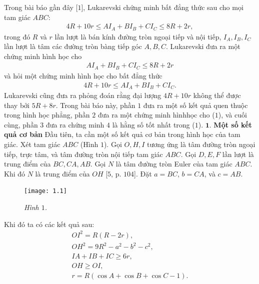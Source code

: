 \begin{multicols}{2}
	\setlength{\abovedisplayskip}{4pt}
	\setlength{\belowdisplayskip}{4pt}
	Trong bài báo gần đây [$1$], Lukarevski chứng minh bất đẳng thức sau cho mọi tam giác $ABC$:
	\begin{align*}
		\label{BDT1}4R+10r\le AI_A+BI_B+CI_C\le 8R+2r,
	\end{align*}
	trong đó $R$ và $r$ lần lượt là bán kính đường tròn ngoại tiếp và nội tiếp, $I_A,I_B,I_C$ lần lượt là tâm các đường tròn bàng tiếp góc $A,B,C$.  
	\vskip 0.05cm
	Lukarevski đưa ra một chứng minh hình học cho 
	\begin{align*}
		AI_A+BI_B+CI_C\le 8R+2r
	\end{align*}
	và hỏi một chứng minh hình học cho bất đẳng thức 
	\begin{align*}
		4R+10r\le AI_A+BI_B+CI_C. \tag{$1$}
	\end{align*}
	Lukarevski cũng đưa ra phỏng đoán rằng đại lượng $4R+10r$ không thể được thay bởi $5R+8r$. Trong bài báo này, phần $1$ đưa ra một số kết quả quen thuộc trong hình học phẳng, phần $2$ đưa ra một chứng minh hình\linebreak học cho ($1$), và cuối cùng,  phần $3$ đưa ra chứng minh $4$ là hằng số tốt nhất trong ($1$).
	\vskip 0.05cm
	$\pmb{1.}$ \textbf{\color{hoccungpi}Một số kết quả cơ bản}
	\vskip 0.05cm
	Đầu tiên, ta cần một số kết quả cơ bản trong hình học của tam giác. Xét tam giác $ABC$ \linebreak(Hình $1$). Gọi $O,H,I$ tương ứng là tâm đường tròn ngoại tiếp, trực tâm, và tâm đường tròn nội tiếp tam giác $ABC$. Gọi $D,E,F$ lần lượt là trung điểm của $BC,CA,AB$. Gọi $N$ là tâm đường tròn Euler của tam giác $ABC$. Khi đó $N$ là trung điểm của $OH$ [$5$, p. $104$]. Đặt $a=BC$, $b=CA$, và $c=AB$.
	\begin{figure}[H]
		\vspace*{-5pt}
		\centering
		\captionsetup{labelformat= empty, justification=centering}
		\texttt{[image: 1.1]}
		\caption{\small\textit{\color{hoccungpi}Hình $1$.}}
		\vspace*{-10pt}
	\end{figure}
	Khi đó ta có các kết quả sau:
	\begin{align*}
		OI^2=R(R-2r), \tag{$2$}\\
		OH^2=9R^2-a^2-b^2-c^2,  \tag{$3$}\\
		IA+IB+IC\ge 6r, \tag{$4$}\\
		OH\ge OI,\tag{$5$}\\
		r=R(\cos{A}+\cos{B}+\cos{C}-1). \tag{$6$}

\end{align*}
\end{multicols}
